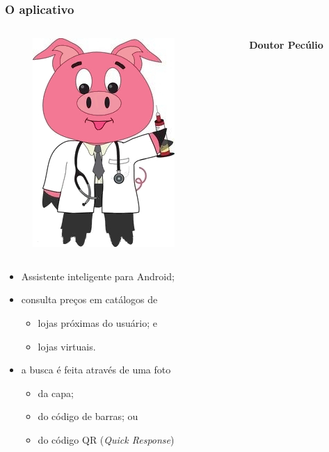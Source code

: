 \documentclass[14pt,beamer]{beamer}
\begin{document}
\begin{frame}
	\frametitle{O aplicativo}
    
	\vspace{-30px}
	\begin{columns}
		\begin{column}{.3\textwidth}
			\begin{figure}
				\includegraphics[scale=.15]{imagens/docpig}
			\end{figure}
		\end{column}%
		\hfill%
		\begin{column}{9\textwidth}
			\large{\textbf{Doutor Pecúlio}}
		\end{column}%
	\end{columns}
	
	\vspace{10px}
	\begin{itemize}
        \item Assistente inteligente para Android;
		\item consulta preços em catálogos de
			\begin{itemize}
				\item lojas próximas do usuário; e
				\item lojas virtuais. 	
			\end{itemize}
		\item a busca é feita através de uma foto
			\begin{itemize}
				\item da capa;
				\item do código de barras; ou
                \item do código QR (\emph{Quick Response})
			\end{itemize}
	\end{itemize}
\end{frame}
\end{document}

